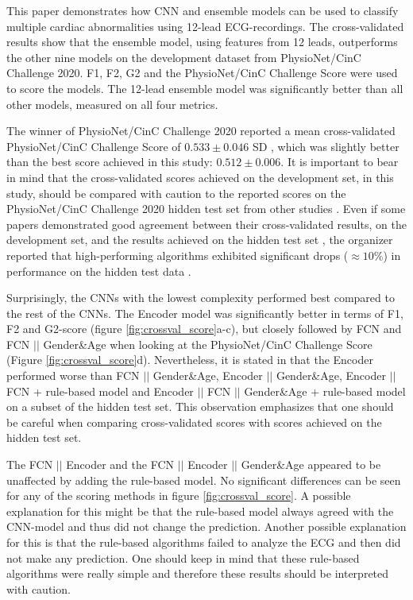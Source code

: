 
This paper demonstrates how CNN and ensemble models can be used to classify multiple cardiac abnormalities using 12-lead ECG-recordings. The cross-validated results show that the ensemble model, using features from 12 leads, outperforms the other nine models on the development dataset from PhysioNet/CinC Challenge 2020. F1, F2, G2 and the PhysioNet/CinC Challenge Score were used to score the models. The 12-lead ensemble model was significantly better than all other models, measured on all four metrics.

The winner of PhysioNet/CinC Challenge 2020 reported a mean  cross-validated PhysioNet/CinC Challenge Score of $0.533\pm0.046$ SD \cite{natarajan_wide_nodate}, which was slightly better than the best score achieved in this study: $0.512\pm 0.006$. It is important to bear in mind that the cross-validated scores achieved on the development set, in this study, should be compared with caution to the reported scores on the PhysioNet/CinC Challenge 2020 hidden test set from other studies \cite{natarajan_wide_nodate,singstad_convolutional_nodate}. Even if some papers demonstrated good agreement between their cross-validated results, on the development set, and the results achieved on the hidden test set \cite{natarajan_wide_nodate}, the organizer reported that high-performing algorithms exhibited significant drops ($\approx 10\%$) in performance on the hidden test data \cite{alday_classification_2020}.

Surprisingly, the CNNs with the lowest complexity performed best compared to the rest of the CNNs. The Encoder model was significantly better in terms of F1, F2 and G2-score (figure \ref{fig:crossval_score}a-c), but closely followed by FCN and FCN $||$ Gender\&Age when looking at the PhysioNet/CinC Challenge Score (Figure \ref{fig:crossval_score}d). Nevertheless, it is stated in \cite{singstad_convolutional_nodate} that the Encoder performed worse than FCN $||$ Gender\&Age, Encoder $||$ Gender\&Age, Encoder $||$ FCN + rule-based model and Encoder $||$ FCN $||$ Gender\&Age + rule-based model on a subset of the hidden test set. This observation emphasizes that one should be careful when comparing cross-validated scores with scores achieved on the hidden test set.

The FCN $||$ Encoder and the FCN $||$ Encoder $||$ Gender\&Age appeared to be unaffected by adding the rule-based model. No significant differences can be seen for any of the scoring methods in figure \ref{fig:crossval_score}. A possible explanation for this might be that the rule-based model always agreed with the CNN-model and thus did not change the prediction. Another possible explanation for this is that the rule-based algorithms failed to analyze the ECG and then did not make any prediction. One should keep in mind that these rule-based algorithms were really simple and therefore these results should be interpreted with caution.

